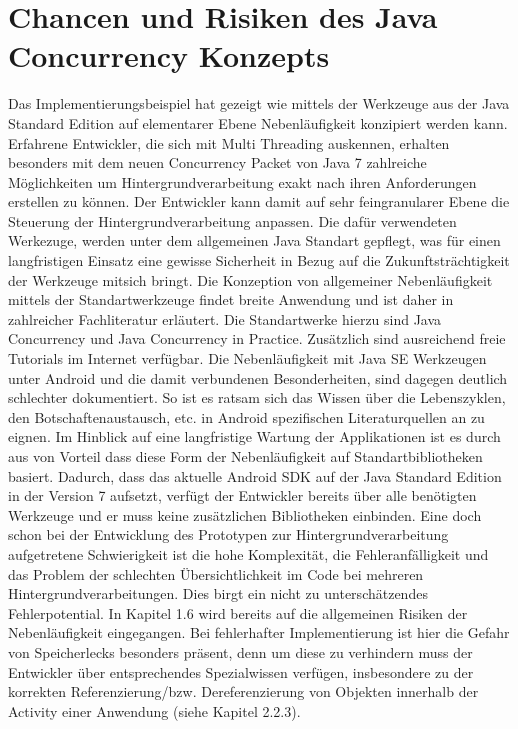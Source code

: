 \documentclass[12pt,oneside,a4paper,bibtotoc,liststotoc]{scrreprt}
\begin{document}
\section{Chancen und Risiken des Java Concurrency Konzepts}
Das Implementierungsbeispiel hat gezeigt wie mittels der Werkzeuge aus der Java Standard Edition auf elementarer Ebene Nebenläufigkeit konzipiert werden kann. Erfahrene Entwickler, die sich mit Multi Threading auskennen, erhalten besonders mit dem neuen Concurrency Packet von Java 7 zahlreiche Möglichkeiten um Hintergrundverarbeitung exakt nach ihren Anforderungen erstellen zu können. Der Entwickler kann damit auf sehr feingranularer Ebene die Steuerung der Hintergrundverarbeitung anpassen. Die dafür verwendeten Werkezuge, werden unter dem allgemeinen Java Standart gepflegt, was für einen langfristigen Einsatz eine gewisse Sicherheit in Bezug auf die Zukunftsträchtigkeit der Werkzeuge mitsich bringt. Die Konzeption von allgemeiner Nebenläufigkeit mittels der Standartwerkzeuge findet breite Anwendung und ist daher in zahlreicher Fachliteratur erläutert. Die Standartwerke hierzu sind Java Concurrency und Java Concurrency in Practice.  Zusätzlich sind ausreichend freie Tutorials im Internet verfügbar. Die Nebenläufigkeit mit Java SE Werkzeugen unter Android und die damit verbundenen Besonderheiten, sind dagegen deutlich schlechter dokumentiert. So ist es ratsam sich das Wissen über die Lebenszyklen, den Botschaftenaustausch, etc. in Android spezifischen Literaturquellen an zu eignen.
Im Hinblick auf eine langfristige Wartung der Applikationen ist es durch aus von Vorteil dass diese Form der Nebenläufigkeit auf Standartbibliotheken basiert. Dadurch, dass das aktuelle Android SDK auf der Java Standard Edition in der Version 7 aufsetzt, verfügt der Entwickler bereits über alle benötigten Werkzeuge und er muss keine zusätzlichen Bibliotheken einbinden.
Eine doch schon bei der Entwicklung des Prototypen zur Hintergrundverarbeitung aufgetretene Schwierigkeit ist die hohe Komplexität, die Fehleranfälligkeit und das Problem der schlechten Übersichtlichkeit im Code bei mehreren Hintergrundverarbeitungen. Dies birgt ein nicht zu unterschätzendes Fehlerpotential. In Kapitel 1.6 wird bereits auf die allgemeinen Risiken der Nebenläufigkeit eingegangen. Bei fehlerhafter Implementierung ist hier die Gefahr von Speicherlecks besonders präsent, denn um diese zu verhindern muss der Entwickler über entsprechendes Spezialwissen verfügen, insbesondere zu der korrekten Referenzierung/bzw. Dereferenzierung von Objekten innerhalb der Activity einer Anwendung (siehe Kapitel 2.2.3).
\end{document}
